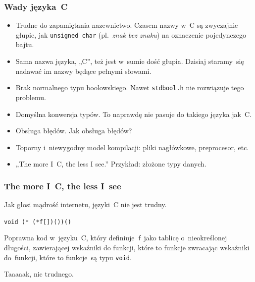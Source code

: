 \documentclass[10pt,t]{beamer}
\begin{document}
\begin{frame}
  \frametitle{Wady języka~C}


  \begin{itemize}

  \item Trudne do zapamiętania nazewnictwo. Czasem nazwy w~C są zwyczajnie
    głupie, jak \texttt{unsigned char} (pl.~\textit{znak bez znaku}) na
    oznaczenie pojedynczego bajtu.

  \item  Sama nazwa języka, „C”, też jest w~sumie dość głupia. Dzisiaj
    staramy~się nadawać im nazwy będące pełnymi słowami.

  \item Brak normalnego typu boolowskiego. Nawet \texttt{stdbool.h} nie
    rozwiązuje tego problemu.

  \item Domyślna konwersja typów. To naprawdę nie pasuje do takiego
    języka jak~C.

  \item Obsługa błędów. Jak obsługa błędów?

  \item Toporny i~niewygodny model kompilacji: pliki nagłówkowe,
    preprocesor, etc.

  \item „The more I~C, the less I see.” Przykład: złożone typy danych.



  \end{itemize}

\end{frame}





\begin{frame}
  \frametitle{The more I~C, the less I~see}


  Jak głosi mądrość internetu, języki~C nie jest trudny.

  \texttt{void (* (*f[])())()}

  Poprawna kod w~języku~C, który definiuje~\texttt{f} jako tablicę
  o~nieokreślonej długości, zawierającej wskaźniki do funkcji, które
  to funkcje zwracając wskaźniki do~funkcji, które to funkcje~są typu
  \texttt{void}.

  Taaaaak, nic trudnego.

\end{frame}
\end{document}
